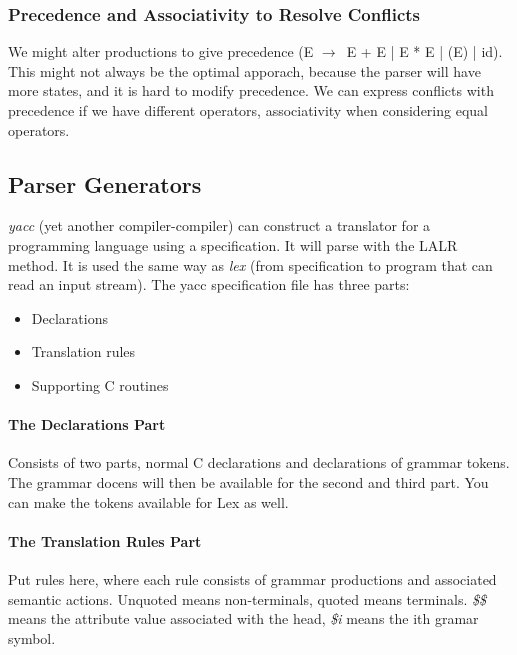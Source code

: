 \documentclass{article}
\newcommand{\ta}{$\to$~}
\begin{document}
\subsubsection{Precedence and Associativity to Resolve Conflicts} %
\label{ssub:Precedence an dAssociativity to Resolve Conflicts}
We might alter productions to give precedence (E \ta E + E | E * E | (E) | id). This might not always be the optimal apporach, because the parser will have more states, and it is hard to modify precedence. We can express conflicts with precedence if we have different operators, associativity when considering equal operators.

\subsection{Parser Generators} %
\label{sub:Parser Generators}
\emph{yacc} (yet another compiler-compiler) can construct a translator for a programming language using a specification. It will parse with the LALR method. It is used the same way as \emph{lex} (from specification to program that can read an input stream). The yacc specification file has three parts:
\begin{itemize}
	\item Declarations
	\item Translation rules
	\item Supporting C routines
\end{itemize}

\paragraph{The Declarations Part} %
\label{par:The Declarations Part}
Consists of two parts, normal C declarations and declarations of grammar tokens. The grammar docens will then be available for the second and third part. You can make the tokens available for Lex as well.

\paragraph{The Translation Rules Part} %
\label{par:The Translation Rules Part}
Put rules here, where each rule consists of grammar productions and associated semantic actions. Unquoted means non-terminals, quoted means terminals. \emph{\$\$} means the attribute value associated with the head, \emph{\$i} means the ith gramar symbol.
\end{document}

